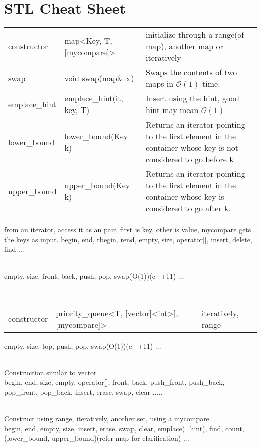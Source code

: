 \section{STL Cheat Sheet}



\begin{tabular}{p{2cm}|p{5cm}|p{5.5cm}}
    constructor &   map\textless Key, T, [mycompare]\textgreater     &   initialize through a range(of map), another map or iteratively \\
    swap    &   void swap(map\& x)   &   Swaps the contents of two maps in $\mathcal{O}(1)$ time. \\
    emplace\_hint    &   emplace\_hint(it, key, T)    &   Insert using the hint, good hint may mean $\mathcal{O}(1)$  \\
    lower\_bound &   lower\_bound(Key k)  &   Returns an iterator pointing to the first element in the container whose key is not considered to go before k \\
    upper\_bound &   upper\_bound(Key k)  &   Returns an iterator pointing to the first element in the container whose key is considered to go after k. 
\end{tabular}

from an iterator, access it as an pair, first is key, other is value, mycompare gets the keys as input.     begin, end, rbegin, rend, empty, size, operator[], insert, delete, find ...

 \\
empty, size, front, back, push, pop, swap(O(1))(c++11) ...

 \\
\begin{tabular}{p{2cm}|p{5cm}|p{5.5cm}}
    constructor &   priority\_queue\textless T, [vector]\textless int\textgreater ], [mycompare]\textgreater    &   iteratively, range  \\
\end{tabular}

empty, size, top, push, pop, swap(O(1))(c++11) ...

 \\
Construction similar to vector \\
begin, end, size, empty, operator[], front, back, push\_front, push\_back, pop\_front, pop\_back, insert, erase, swap, clear .....

 \\
Construct using range, iteratively, another set, using a mycompare \\
begin, end, empty, size, insert, erase, swap, clear, emplace(\_hint), find, count, (lower\_bound, upper\_bound)(refer map for clarification) ... 

